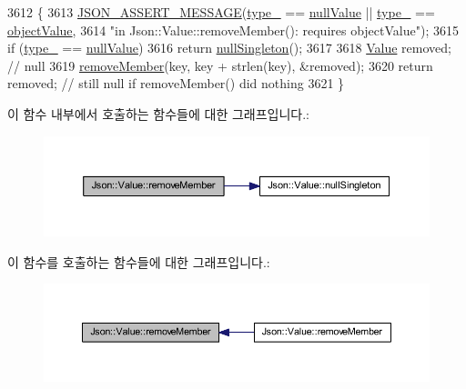 \begin{DoxyCode}
3612 \{
3613   \hyperlink{json_8h_ad7facdeeca0f495765e3b204c265eadb}{JSON\_ASSERT\_MESSAGE}(\hyperlink{class_json_1_1_value_abd222c2536dc88bf330dedcd076d2356}{type\_} == \hyperlink{namespace_json_a7d654b75c16a57007925868e38212b4ea7d9899633b4409bd3fc107e6737f8391}{nullValue} || 
      \hyperlink{class_json_1_1_value_abd222c2536dc88bf330dedcd076d2356}{type\_} == \hyperlink{namespace_json_a7d654b75c16a57007925868e38212b4eae8386dcfc36d1ae897745f7b4f77a1f6}{objectValue},
3614                       \textcolor{stringliteral}{"in Json::Value::removeMember(): requires objectValue"});
3615   \textcolor{keywordflow}{if} (\hyperlink{class_json_1_1_value_abd222c2536dc88bf330dedcd076d2356}{type\_} == \hyperlink{namespace_json_a7d654b75c16a57007925868e38212b4ea7d9899633b4409bd3fc107e6737f8391}{nullValue})
3616     \textcolor{keywordflow}{return} \hyperlink{class_json_1_1_value_af2f124567acc35d021a424e53ebdfcab}{nullSingleton}();
3617 
3618   \hyperlink{class_json_1_1_value}{Value} removed;  \textcolor{comment}{// null}
3619   \hyperlink{class_json_1_1_value_aa52f7873b95d29627d6e83ba96f69aaa}{removeMember}(key, key + strlen(key), &removed);
3620   \textcolor{keywordflow}{return} removed; \textcolor{comment}{// still null if removeMember() did nothing}
3621 \}
\end{DoxyCode}
이 함수 내부에서 호출하는 함수들에 대한 그래프입니다.\+:\nopagebreak
\begin{figure}[H]
\begin{center}
\leavevmode
\includegraphics[width=350pt]{class_json_1_1_value_aa52f7873b95d29627d6e83ba96f69aaa_cgraph}
\end{center}
\end{figure}
이 함수를 호출하는 함수들에 대한 그래프입니다.\+:\nopagebreak
\begin{figure}[H]
\begin{center}
\leavevmode
\includegraphics[width=350pt]{class_json_1_1_value_aa52f7873b95d29627d6e83ba96f69aaa_icgraph}
\end{center}
\end{figure}
\mbox{\label{class_json_1_1_value_a1dfd5d30fbc53fcd9c4955b8b3e7885c}} 
